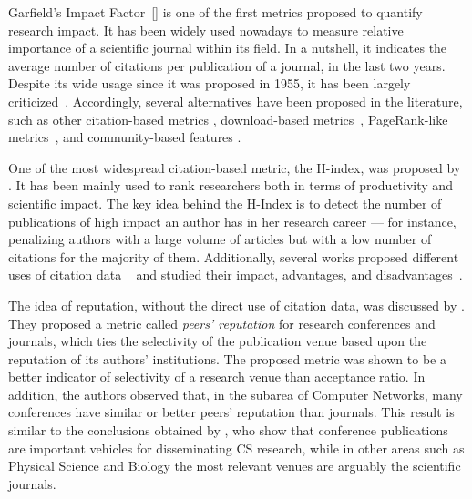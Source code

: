 \documentclass[msc]{ppgccufmg}
\begin{document}
Garfield's Impact Factor~[\citeyear{garfield1955}] is one of the first metrics proposed to quantify research impact. It has been widely used nowadays to measure relative importance of a scientific journal within its field. In a nutshell, it indicates the average number of citations per publication of a journal, in the last two years.  Despite its wide usage since it was proposed in 1955, it has been largely criticized~\citep{saha2003}. 
%
Accordingly, several alternatives have been proposed in the literature, such as other citation-based metrics \citep{egghe2006theory,waltman11,sun2007popularity,waltman11,yan2011p,zscore}, download-based metrics~\citep{bollen2005toward}, PageRank-like metrics~\citep{gollapalli2011ranking,Yan:2007}, and community-based features \citep{Silva14}. 

One of the most widespread citation-based metric, the H-index, was proposed by \cite{hirsch2005}. It has been mainly used to rank researchers both in terms of productivity and scientific impact. The key idea behind the H-Index is to detect the number of publications of high impact an author has in her research career --- for instance, penalizing authors with a large volume of articles but with a low number of citations for the majority of them. Additionally, several works proposed different uses of citation data ~\citep{ding2011,egghe2006theory,sun2007popularity,yan2011p} and studied their impact, advantages, and disadvantages~\citep{martins2009,leydesdorff2009new}.

The idea of reputation, without the direct use of citation data, was discussed by \cite{nelakuditi2011snap}. They proposed a metric called \textit{peers' reputation} for research conferences and journals, which ties the selectivity of the publication venue based upon the reputation of its authors' institutions. The proposed metric was shown to be a better indicator of selectivity of a research venue than acceptance ratio. In addition, the authors observed that, in the subarea of Computer Networks, many conferences have similar or better peers' reputation than journals. This result is similar to the conclusions obtained by \cite{laender2008}, who show that conference publications are important vehicles for disseminating CS research, while in other areas such as Physical Science and Biology the most relevant venues are arguably the scientific journals.
\end{document}
